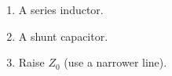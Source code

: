 \begin{enumerate}[leftmargin=1.6em,itemsep=2pt]
\item A series inductor.
\item A shunt capacitor.
\item Raise $Z_0$ (use a narrower line).
\end{enumerate}
